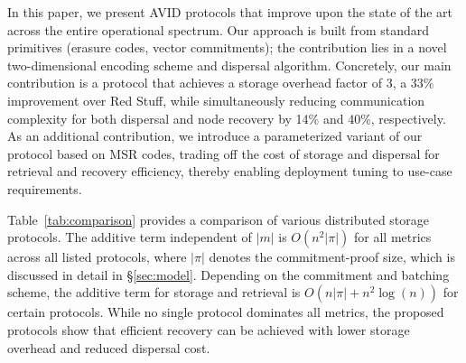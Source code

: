 \documentclass[sigconf,screen]{acmart}
\begin{document}
In this paper, we present AVID protocols that improve upon the state of the art across the entire operational spectrum.
Our approach is built from standard primitives (erasure codes, vector commitments); the contribution lies in a novel two-dimensional encoding scheme and dispersal algorithm.
Concretely, our main contribution is a protocol that achieves a storage overhead factor of $3$, a 33\% improvement over Red Stuff, while simultaneously reducing communication complexity for both dispersal and node recovery by 14\% and 40\%, respectively.
As an additional contribution, we introduce a parameterized variant of our protocol based on MSR codes, trading off the cost of storage and dispersal for retrieval and recovery efficiency, thereby enabling deployment tuning to use-case requirements.

Table~\ref{tab:comparison} provides a comparison of various distributed storage protocols.
The additive term independent of $|m|$ is $O(n^2|\pi|)$ for all metrics across all listed protocols, where $|\pi|$ denotes the commitment-proof size, which is discussed in detail in \S\ref{sec:model}. Depending on the commitment and batching scheme, the additive term for storage and retrieval is $O(n|\pi| + n^2\log(n))$ for certain protocols.
While no single protocol dominates all metrics, the proposed protocols show that efficient recovery can be achieved with lower storage overhead and reduced dispersal cost.
\end{document}

